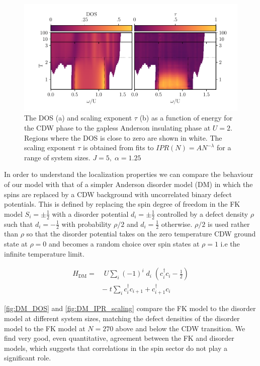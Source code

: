 \hypertarget{fig:gap_opening_U2}{%
\begin{figure}
\centering
\includegraphics[width=1\textwidth,height=\textheight]{figure_code/fk_chapter/gap_opening/gap_opening_U2}
\caption[{DOS and Scaling Exponents for the transition from CDW to the Anderson Phase}]{The DOS (a) and scaling exponent \(\tau\) (b) as a function of energy for the CDW phase to the gapless Anderson insulating phase at \(U=2\). Regions where the DOS is close to zero are shown in white. The scaling exponent \(\tau\) is obtained from fits to \(IPR(N) = A N^{-\lambda}\) for a range of system sizes. \(J = 5,\;\alpha = 1.25\)}
\label{fig:gap_opening_U2}
\end{figure}
}

In order to understand the localization properties we can compare the behaviour of our model with that of a simpler Anderson disorder model (DM) in which the spins are replaced by a CDW background with uncorrelated binary defect potentials. This is defined by replacing the spin degree of freedom in the FK model \(S_i = \pm \tfrac{1}{2}\) with a disorder potential \(d_i = \pm \tfrac{1}{2}\) controlled by a defect density \(\rho\) such that \(d_i = -\tfrac{1}{2}\) with probability \(\rho/2\) and \(d_i = \tfrac{1}{2}\) otherwise. \(\rho/2\) is used rather than \(\rho\) so that the disorder potential takes on the zero temperature CDW ground state at \(\rho = 0\) and becomes a random choice over spin states at \(\rho = 1\) i.e the infinite temperature limit.

\[\begin{aligned}
H_{\mathrm{DM}} = & \;U \sum_{i} (-1)^i \; d_i \;(c^\dagger_{i}c_{i} - \tfrac{1}{2}) \\
& -\;t \sum_{i} c^\dagger_{i}c_{i+1} + c^\dagger_{i+1}c_{i}
\end{aligned}\]

\cref{fig:DM_DOS} and \cref{fig:DM_IPR_scaling} compare the FK model to the disorder model at different system sizes, matching the defect densities of the disorder model to the FK model at \(N = 270\) above and below the CDW transition. We find very good, even quantitative, agreement between the FK and disorder models, which suggests that correlations in the spin sector do not play a significant role.

